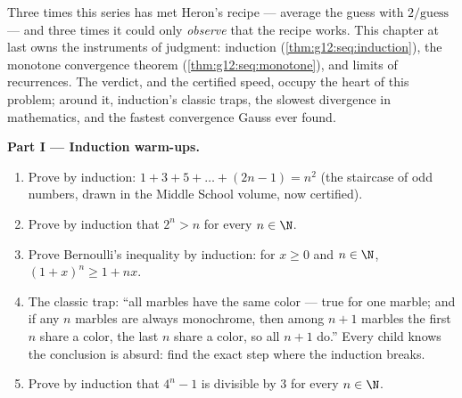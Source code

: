\begin{problem}
\label{pb:g12:seq:1}
Three times this series has met Heron's recipe --- average the
guess with $2/\text{guess}$ --- and three times it could only
\emph{observe} that the recipe works. This chapter at last owns
the instruments of judgment: induction
(\cref{thm:g12:seq:induction}), the monotone convergence theorem
(\cref{thm:g12:seq:monotone}), and limits of recurrences. The
verdict, and the certified speed, occupy the heart of this
problem; around it, induction's classic traps, the slowest
divergence in mathematics, and the fastest convergence Gauss ever
found.

\medskip
\noindent\textbf{Part I --- Induction warm-ups.}
\begin{enumerate}
  \item Prove by induction:
        $1 + 3 + 5 + \dots + (2n - 1) = n^2$ (the staircase of
        odd numbers, drawn in the Middle School volume, now
        certified).
  \item Prove by induction that $2^n > n$ for every
        $n \in \N$.
  \item Prove Bernoulli's inequality by induction: for
        $x \geq 0$ and $n \in \N$,
        $(1 + x)^n \geq 1 + nx$.
  \item The classic trap: ``all marbles have the same color ---
        true for one marble; and if any $n$ marbles are always
        monochrome, then among $n + 1$ marbles the first $n$
        share a color, the last $n$ share a color, so all
        $n + 1$ do.'' Every child knows the conclusion is
        absurd: find the exact step where the induction breaks.
  \item Prove by induction that $4^n - 1$ is divisible by $3$
        for every $n \in \N$.
\end{enumerate}


\end{problem}
